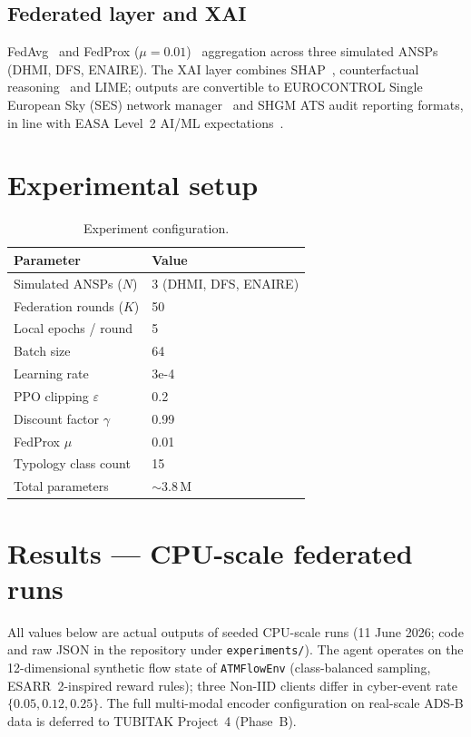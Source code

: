 \documentclass[11pt]{article}
\begin{document}
\subsection{Federated layer and XAI}
FedAvg~\cite{mcmahan2017} and FedProx ($\mu=0.01$)~\cite{li2020} aggregation across three simulated ANSPs (DHMI, DFS, ENAIRE). The XAI layer combines SHAP~\cite{lundberg2017}, counterfactual reasoning~\cite{wachter2017} and LIME; outputs are convertible to EUROCONTROL Single European Sky (SES) network manager~\cite{sesar} and SHGM ATS audit reporting formats, in line with EASA Level~2 AI/ML expectations~\cite{easaai}.

\section{Experimental setup}
\begin{table}[ht]\centering\small
\caption{Experiment configuration.}
\begin{tabular}{ll}
\toprule
\textbf{Parameter} & \textbf{Value}\\
\midrule
Simulated ANSPs ($N$) & 3 (DHMI, DFS, ENAIRE)\\
Federation rounds ($K$) & 50\\
Local epochs / round & 5\\
Batch size & 64\\
Learning rate & 3e-4\\
PPO clipping $\varepsilon$ & 0.2\\
Discount factor $\gamma$ & 0.99\\
FedProx $\mu$ & 0.01\\
Typology class count & 15\\
Total parameters & ${\sim}3.8$\,M\\
\bottomrule
\end{tabular}
\end{table}

\section{Results --- CPU-scale federated runs}
All values below are actual outputs of seeded CPU-scale runs (11 June 2026; code and raw JSON in the repository under \texttt{experiments/}). The agent operates on the 12-dimensional synthetic flow state of \texttt{ATMFlowEnv} (class-balanced sampling, ESARR~2-inspired reward rules); three Non-IID clients differ in cyber-event rate $\{0.05, 0.12, 0.25\}$. The full multi-modal encoder configuration on real-scale ADS-B data is deferred to TUBITAK Project~4 (Phase~B).
\end{document}
